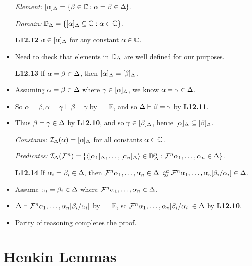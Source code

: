 \documentclass[a4paper, 11pt]{article} %
\begin{document}
\begin{itemize}
  \item[\it Element:] $[\alpha]_{\Delta}=\lbrace\beta\in\mathbb{C} : \alpha=\beta\in\Delta\rbrace$.
  \item[\it Domain:] $\mathbb{D}_{\Delta}=\lbrace[\alpha]_{\Delta} \subseteq \mathbb{C} : \alpha\in\mathbb{C}\rbrace$.
  \item[\bf L12.12] $\alpha\in[\alpha]_{\Delta}$ for any constant $\alpha\in\mathbb{C}$.
    \item Need to check that elements in $\mathbb{D}_{\Delta}$ are well defined for our purposes. 
  \item[\bf L12.13] If $\alpha=\beta\in\Delta$, then $[\alpha]_{\Delta}=[\beta]_{\Delta}$.
  \item Assuming $\alpha=\beta\in\Delta$ where $\gamma\in[\alpha]_{\Delta}$, we know $\alpha=\gamma\in\Delta$.
  \item So $\alpha=\beta,\alpha=\gamma\vdash\beta=\gamma$ by $=$E, and so $\Delta\vdash\beta=\gamma$ by \textbf{L12.11}.
  \item Thus $\beta=\gamma\in\Delta$ by \textbf{L12.10}, and so $\gamma\in[\beta]_{\Delta}$, hence $[\alpha]_{\Delta}\subseteq[\beta]_{\Delta}$.
  \item[\it Constants:] $\mathcal{I}_{\Delta}(\alpha)=[\alpha]_{\Delta}$ for all constants $\alpha\in\mathbb{C}$.
  \item[\it Predicates:] $\mathcal{I}_{\Delta}(\mathcal{F}^n)=\lbrace\langle[\alpha_1]_{\Delta},\ldots,[\alpha_n]_{\Delta}\rangle\in\mathbb{D}_{\Delta}^n:\mathcal{F}^n\alpha_1,\ldots,\alpha_n\in\Delta\rbrace$.
  \item[\bf L12.14] If $\alpha_i=\beta_i\in\Delta$, then $\mathcal{F}^n\alpha_1,\ldots,\alpha_n\in\Delta$ \textit{iff} $\mathcal{F}^n\alpha_1,\ldots,\alpha_n[\beta_i/\alpha_i]\in\Delta$.
    \setcounter{enumi}{0}
  \item Assume $\alpha_i=\beta_i\in\Delta$ where $\mathcal{F}^n\alpha_1,\ldots,\alpha_n\in\Delta$.
  \item $\Delta\vdash\mathcal{F}^n\alpha_1,\ldots,\alpha_n[\beta_i/\alpha_i]$ by $=$E, so $\mathcal{F}^n\alpha_1,\ldots,\alpha_n[\beta_i/\alpha_i]\in\Delta$ by \textbf{L12.10}.
  \item Parity of reasoning completes the proof.
\end{itemize}




\section*{Henkin Lemmas}
\end{document}
